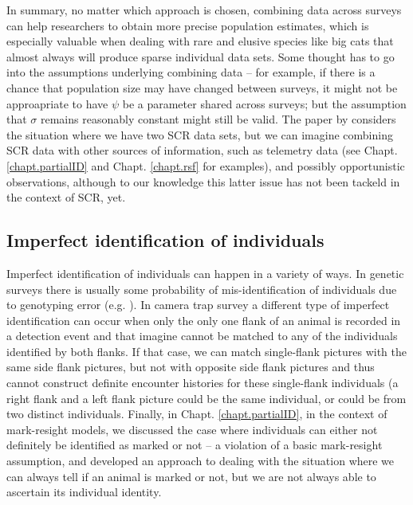 In summary, no matter which approach is chosen, combining data across surveys can help researchers to obtain more precise population estimates, which is especially valuable when dealing with rare and elusive species like big cats that almost always will produce sparse individual data sets. Some thought has to go into the assumptions underlying combining data -- for example, if there is a chance that population size may have changed between surveys, it might not be approapriate to have $\psi$ be a parameter shared across surveys; but the assumption that $\sigma$ remains reasonably constant might still be valid. The paper by \citet{gopalaswamy_etal:2012} considers the situation where we have two SCR data sets, but we can imagine combining SCR data with other sources of information, such as telemetry data (see Chapt. \ref{chapt.partialID} and Chapt. \ref{chapt.rsf} for examples), and possibly opportunistic observations, although to our knowledge this latter issue has not been tackeld in the context of SCR, yet. 


\subsection{Imperfect identification of individuals}
Imperfect identification of individuals can happen in a variety of ways. In genetic surveys there is usually some probability of mis-identification of individuals due to genotyping error (e.g. \citet{lukacs_burnham:2005}). In camera trap survey a different type of imperfect identification can occur when only the only one flank of an animal is recorded in a detection event and that imagine cannot be matched to any of the individuals identified by both flanks. If that case, we can match single-flank pictures with the same side flank pictures, but not with opposite side flank pictures and thus cannot construct definite encounter histories for these single-flank individuals (a right flank and a left flank picture could be the same individual, or could be from two distinct individuals. Finally, in Chapt. \ref{chapt.partialID}, in the context of mark-resight models, we discussed the case where individuals can either not definitely be identified as marked or not -- a violation of a basic mark-resight assumption, and developed an approach to dealing with the situation where we can always tell if an animal is marked or not, but we are not always able to ascertain its individual identity. 

